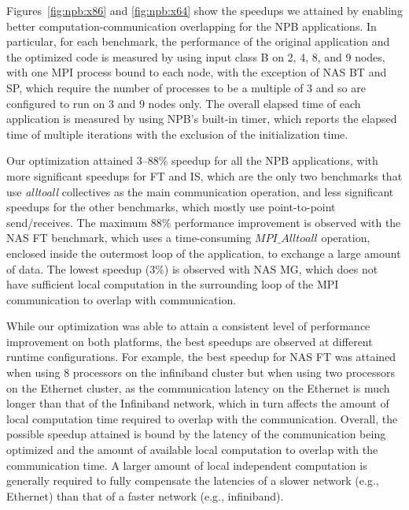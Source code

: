 Figures~\ref{fig:npb:x86} and \ref{fig:npb:x64} show the speedups we
attained by enabling better computation-communication overlapping for
the NPB applications.  In particular, for each benchmark, the
performance of the original application and the optimized code is
measured by using input class B on 2, 4, 8, and 9 nodes, with one MPI
process bound to each node, with the exception of NAS BT and SP, which
require the number of processes to be a multiple of 3 and so are
configured to run on 3 and 9 nodes only.  The overall elapsed time of
each application is measured by using NPB's built-in timer, which
reports the elapsed time of multiple iterations with the exclusion of
the initialization time.

Our optimization attained 3--88\% speedup for all the NPB applications, 
with more significant speedups for FT and IS, which are the only two benchmarks that
use {\em alltoall} collectives as the main communication operation, 
and less significant speedups for the other benchmarks, which mostly use point-to-point send/receives.  
The maximum 88\% performance improvement is observed with the NAS FT
benchmark, which uses a time-consuming $MPI\_Alltoall$ operation,
enclosed inside the outermost loop of the application, to exchange a
large amount of data.  The lowest speedup (3\%) is observed with NAS
MG, which does not have sufficient local computation in the
surrounding loop of the MPI communication to overlap with
communication. 


While our optimization was able to attain a consistent level of performance improvement on both platforms, 
the best speedups are observed at different runtime configurations. 
For example, the best speedup for NAS FT was attained when using 8 processors on the infiniband cluster
but when using two processors on the Ethernet cluster, as the communication latency on the Ethernet is much longer than 
that of the Infiniband network, which in turn affects the amount of local computation time required to overlap with the communication.
Overall,  the possible speedup attained is bound by the latency of the communication being optimized and the amount of available
local computation to overlap with the communication time. A larger amount of local independent computation is generally required to fully compensate the latencies of a slower network (e.g., Ethernet) than that of a faster network (e.g., infiniband).
